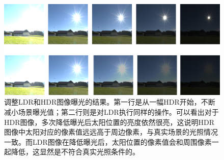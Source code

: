 \begin{figure}[!htbp]
    \centering
    \includegraphics[width=1.0\textwidth]{Img/exposure-change.png}
    \caption[LDR图片与HDR图片在调整曝光时的不同]
    {调整LDR和HDR图像曝光的结果。第一行是从一幅HDR开始，不断减小场景曝光值；第二行则是对LDR执行同样的操作。可以看出对于HDR图像，多次降低曝光后太阳位置的亮度依然很亮，这说明HDR图像中太阳对应的像素值远远高于周边像素，与真实场景的光照情况一致。而LDR图像在降低曝光后，太阳位置的像素值会和周围像素一起降低，这显然是不符合真实光照条件的。}
    \label{fig:exposure-change}
\end{figure}